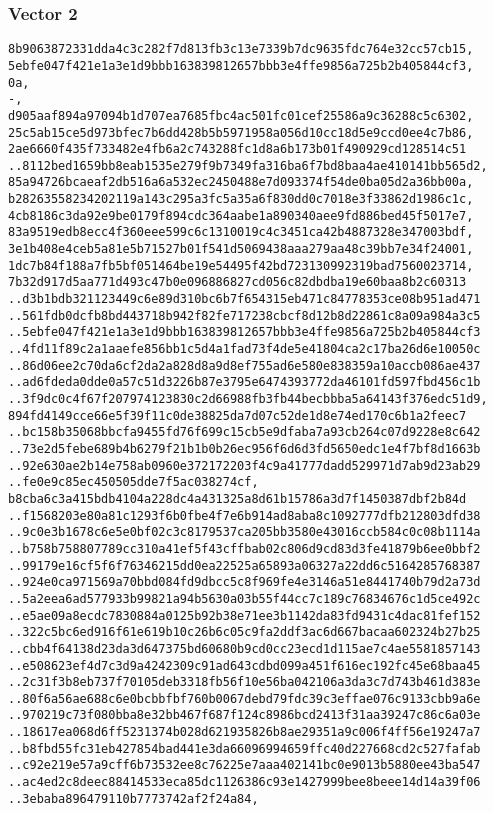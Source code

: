 \documentclass[
]{article}
\begin{document}
\hypertarget{vector-2-2}{%
\subsubsection{Vector 2}\label{vector-2-2}}

\begin{verbatim}
8b9063872331dda4c3c282f7d813fb3c13e7339b7dc9635fdc764e32cc57cb15,
5ebfe047f421e1a3e1d9bbb163839812657bbb3e4ffe9856a725b2b405844cf3,
0a,
-,
d905aaf894a97094b1d707ea7685fbc4ac501fc01cef25586a9c36288c5c6302,
25c5ab15ce5d973bfec7b6dd428b5b5971958a056d10cc18d5e9ccd0ee4c7b86,
2ae6660f435f733482e4fb6a2c743288fc1d8a6b173b01f490929cd128514c51
..8112bed1659bb8eab1535e279f9b7349fa316ba6f7bd8baa4ae410141bb565d2,
85a94726bcaeaf2db516a6a532ec2450488e7d093374f54de0ba05d2a36bb00a,
b28263558234202119a143c295a3fc5a35a6f830dd0c7018e3f33862d1986c1c,
4cb8186c3da92e9be0179f894cdc364aabe1a890340aee9fd886bed45f5017e7,
83a9519edb8ecc4f360eee599c6c1310019c4c3451ca42b4887328e347003bdf,
3e1b408e4ceb5a81e5b71527b01f541d5069438aaa279aa48c39bb7e34f24001,
1dc7b84f188a7fb5bf051464be19e54495f42bd723130992319bad7560023714,
7b32d917d5aa771d493c47b0e096886827cd056c82dbdba19e60baa8b2c60313
..d3b1bdb321123449c6e89d310bc6b7f654315eb471c84778353ce08b951ad471
..561fdb0dcfb8bd443718b942f82fe717238cbcf8d12b8d22861c8a09a984a3c5
..5ebfe047f421e1a3e1d9bbb163839812657bbb3e4ffe9856a725b2b405844cf3
..4fd11f89c2a1aaefe856bb1c5d4a1fad73f4de5e41804ca2c17ba26d6e10050c
..86d06ee2c70da6cf2da2a828d8a9d8ef755ad6e580e838359a10accb086ae437
..ad6fdeda0dde0a57c51d3226b87e3795e6474393772da46101fd597fbd456c1b
..3f9dc0c4f67f207974123830c2d66988fb3fb44becbbba5a64143f376edc51d9,
894fd4149cce66e5f39f11c0de38825da7d07c52de1d8e74ed170c6b1a2feec7
..bc158b35068bbcfa9455fd76f699c15cb5e9dfaba7a93cb264c07d9228e8c642
..73e2d5febe689b4b6279f21b1b0b26ec956f6d6d3fd5650edc1e4f7bf8d1663b
..92e630ae2b14e758ab0960e372172203f4c9a41777dadd529971d7ab9d23ab29
..fe0e9c85ec450505dde7f5ac038274cf,
b8cba6c3a415bdb4104a228dc4a431325a8d61b15786a3d7f1450387dbf2b84d
..f1568203e80a81c1293f6b0fbe4f7e6b914ad8aba8c1092777dfb212803dfd38
..9c0e3b1678c6e5e0bf02c3c8179537ca205bb3580e43016ccb584c0c08b1114a
..b758b758807789cc310a41ef5f43cffbab02c806d9cd83d3fe41879b6ee0bbf2
..99179e16cf5f6f76346215dd0ea22525a65893a06327a22dd6c5164285768387
..924e0ca971569a70bbd084fd9dbcc5c8f969fe4e3146a51e8441740b79d2a73d
..5a2eea6ad577933b99821a94b5630a03b55f44cc7c189c76834676c1d5ce492c
..e5ae09a8ecdc7830884a0125b92b38e71ee3b1142da83fd9431c4dac81fef152
..322c5bc6ed916f61e619b10c26b6c05c9fa2ddf3ac6d667bacaa602324b27b25
..cbb4f64138d23da3d647375bd60680b9cd0cc23ecd1d115ae7c4ae5581857143
..e508623ef4d7c3d9a4242309c91ad643cdbd099a451f616ec192fc45e68baa45
..2c31f3b8eb737f70105deb3318fb56f10e56ba042106a3da3c7d743b461d383e
..80f6a56ae688c6e0bcbbfbf760b0067debd79fdc39c3effae076c9133cbb9a6e
..970219c73f080bba8e32bb467f687f124c8986bcd2413f31aa39247c86c6a03e
..18617ea068d6ff5231374b028d621935826b8ae29351a9c006f4ff56e19247a7
..b8fbd55fc31eb427854bad441e3da66096994659ffc40d227668cd2c527fafab
..c92e219e57a9cff6b73532ee8c76225e7aaa402141bc0e9013b5880ee43ba547
..ac4ed2c8deec88414533eca85dc1126386c93e1427999bee8beee14d14a39f06
..3ebaba896479110b7773742af2f24a84,
\end{verbatim}
\end{document}
